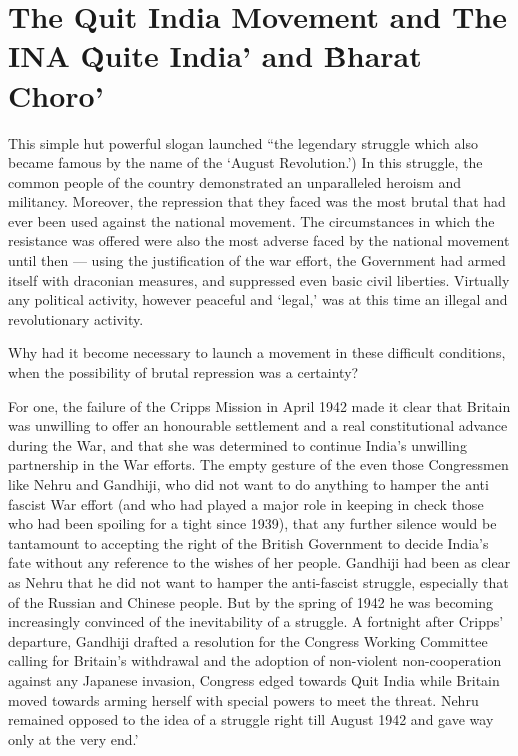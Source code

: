 \chapter[The Quit India Movement, INA \& Bharat Choro]{The Quit India Movement and The INA \`Quite India' and \`Bharat Choro'}

This simple hut powerful slogan launched ``the legendary struggle which also became famous by the name of the `August Revolution.') In this struggle, the common people of the country demonstrated an unparalleled heroism and militancy. Moreover, the repression that they faced was the most brutal that had ever been used against the national movement. The circumstances in which the resistance was offered were also the most adverse faced by the national movement until then --- using the justification of the war effort, the Government had armed itself with draconian measures, and suppressed even basic civil liberties. Virtually any political activity, however peaceful and `legal,' was at this time an illegal and revolutionary activity.

Why had it become necessary to launch a movement in these difficult conditions, when the possibility of brutal repression was a certainty?

For one, the failure of the Cripps Mission in April 1942 made it clear that Britain was unwilling to offer an honourable settlement and a real constitutional advance during the War, and that she was determined to continue India's unwilling partnership in the War efforts. The empty gesture of the even those Congressmen like Nehru and Gandhiji, who did not want to do anything to hamper the anti fascist War effort (and who had played a major role in keeping in check those who had been spoiling for a tight since 1939), that any further silence would be tantamount to accepting the right of the British Government to decide India's fate without any reference to the wishes of her people. Gandhiji had been as clear as Nehru that he did not want to hamper the anti-fascist struggle, especially that of the Russian and Chinese people. But by the spring of 1942 he was becoming increasingly convinced of the inevitability of a struggle. A fortnight after Cripps' departure, Gandhiji drafted a resolution for the Congress Working Committee calling for Britain's withdrawal and the adoption of non-violent non-cooperation against any Japanese invasion, Congress edged towards Quit India while Britain moved towards arming herself with special powers to meet the threat. Nehru remained opposed to the idea of a struggle right till August 1942 and gave way only at the very end.'

